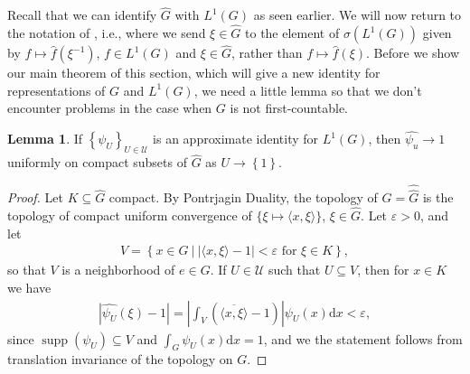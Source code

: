 \documentclass[10pt,twoside,openany,final]{memoir}
\theoremstyle{definition}
\newtheorem{lemma}[theorem]{Lemma}
\theoremstyle{Break}
\newcommand{\G}{\widehat{G}}
\DeclareMathOperator{\supp}{supp}
\renewcommand{\d}{\mathrm{d}}
\begin{document}
Recall that we can identify $\G$ with $L^1(G)$ as seen earlier. We will now return to the notation of , i.e., where we send $\xi \in \G$ to the element of $\sigma(L^1(G))$ given by $f \mapsto \widehat{f}(\xi^{-1})$, $f \in L^1(G)$ and $\xi \in \G$, rather than $f \mapsto \widehat{f}(\xi)$. Before we show our main theorem of this section, which will give a new identity for representations of $G$ and $L^1(G)$, we need a little lemma so that we don't encounter problems in the case when $G$ is not first-countable.
\begin{lemma}
	If $\left\{ \psi_U\right\}_{U \in \mathcal{U}}$ is an approximate identity for $L^1(G)$, then $\widehat{\psi_u}\to 1$ uniformly on compact subsets of $\G$ as $U \to \left\{ 1 \right\}$. 
	\label{4.46}
\end{lemma}
\begin{proof}
	Let $K \subseteq \G$ compact. By Pontrjagin Duality, the topology of $G=\widehat\G$ is the topology of compact uniform convergence of $\{\xi \mapsto \langle x,\xi\rangle\}$, $\xi \in \G$. Let $\varepsilon > 0$, and let
\begin{align*}
	V=\left\{ x \in G \ \big| \ | \langle x, \xi \rangle - 1 | < \varepsilon \text{ for } \xi \in K \right\},
\end{align*}
so that $V$ is a neighborhood of $e \in G$. If $U \in \mathcal{U}$ such that $U \subseteq V$, then for $x \in K$ we have
\begin{align*}
	|\widehat{\psi_U}(\xi)-1|=\left| \int_V (\overline{\langle x, \xi\rangle}-1)\right| \psi_U(x) \d x < \varepsilon,
\end{align*}
since $\supp(\psi_U)\subseteq V$ and $\int_G \psi_U(x) \d x = 1$, and we the statement follows from translation invariance of the topology on $G$.
\end{proof}
\end{document}
